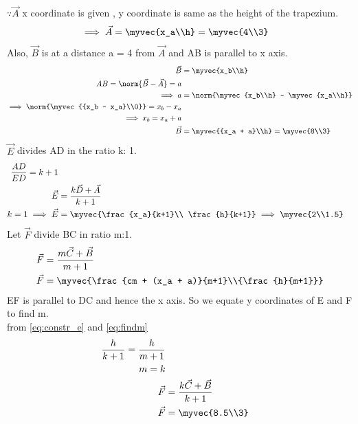\begin{enumerate}[label=\thesection.\arabic*.,ref=\thesection.\theenumi]
$\because \vec{A}$ x coordinate is given , y coordinate is same as the height of the trapezium.  
\begin{align}
\implies \vec{A} &= \myvec{x_a\\h} = \myvec{4\\3}
\label{eq:constr_a}
\end{align}
%
Also, $\vec{B}$ is at a distance a = 4 from $\vec {A}$ and AB is parallel to x axis. 
\begin{align}
\vec{B} &= \myvec{x_b\\h}
\\
AB = \norm{\vec{B}-\vec{A}} = a
\\
\implies a &= \norm{\myvec{x_b\\h} - \myvec{x_a\\h}} 
\\
\implies \norm{\myvec{{x_b - x_a}\\0}} = {x_b - x_a}
\\
\implies x_b = {x_a + a}
\\
\vec{B} &= \myvec{{x_a + a}\\h} = \myvec{8\\3}
\label{eq:constr_b}
\end{align}
%
$\vec{E}$ divides AD in the ratio k: 1. 
\begin{align}
\frac{AD}{ED} = k+1 
\\
\vec{E} &= \frac{{{k\vec{D}} +\vec{A}}}{k+1}
\\
k = 1 \implies \vec{E} & =\myvec{\frac{x_a}{k+1}\\ \frac{h}{k+1}}
\implies \myvec{2\\1.5} 
\label{eq:constr_e}
\end{align}
%
Let $\vec{F}$ divide BC in ratio m:1.
\begin{align}
\vec{F} &= \frac{{{m\vec{C}} +\vec{B}}}{m+1}
\\
\vec{F} &= \myvec{\frac{cm + (x_a + a)}{m+1}\\{\frac{h}{m+1}}}
\label{eq:findm}
\end{align}
EF is parallel to DC and hence the x axis. So we equate y coordinates of E and F to find m.
\\
from \ref{eq:constr_e} and \ref{eq:findm}
\begin{align}
\frac{h}{k+1} = \frac{h}{m+1}
\\
 m = k 
\\
\vec{F} &= \frac{{k\vec{C} +\vec{B}}}{k+1}
\\
\vec{F} &= \myvec{8.5\\3}
\label{eq:constr_f}
\end{align}
%


\end{enumerate}
